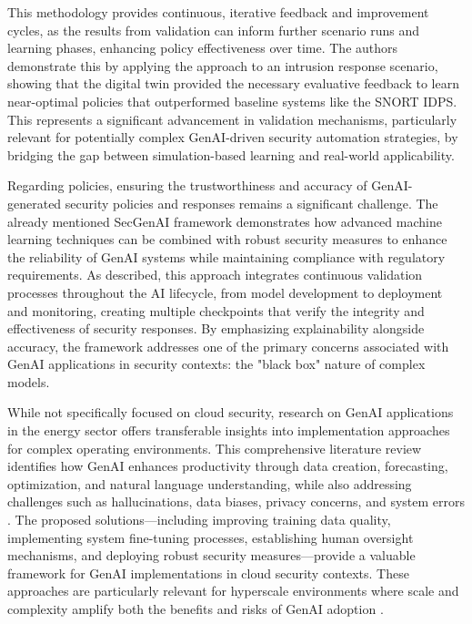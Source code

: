 This methodology provides continuous, iterative feedback and improvement cycles, as the results from validation can inform further scenario runs and learning phases, enhancing policy effectiveness over time\cite{hammar_digital_2023}. The authors demonstrate this by applying the approach to an intrusion response scenario, showing that the digital twin provided the necessary evaluative feedback to learn near-optimal policies that outperformed baseline systems like the SNORT IDPS\cite{zhou_study_2010}. This represents a significant advancement in validation mechanisms, particularly relevant for potentially complex GenAI-driven security automation strategies, by bridging the gap between simulation-based learning and real-world applicability\cite{hammar_digital_2023}.

Regarding policies, ensuring the trustworthiness and accuracy of GenAI-generated security policies and responses remains a significant challenge. The already mentioned SecGenAI framework demonstrates how advanced machine learning techniques can be combined with robust security measures to enhance the reliability of GenAI systems while maintaining compliance with regulatory requirements.\cite{haryanto_secgenai_2024}
As described, this approach integrates continuous validation processes throughout the AI lifecycle, from model development to deployment and monitoring, creating multiple checkpoints that verify the integrity and effectiveness of security responses. By emphasizing explainability alongside accuracy, the framework addresses one of the primary concerns associated with GenAI applications in security contexts: the "black box" nature of complex models.\cite{haryanto_secgenai_2024}

While not specifically focused on cloud security, research on GenAI applications in the energy sector offers transferable insights into implementation approaches for complex operating environments. This comprehensive literature review identifies how GenAI enhances productivity through data creation, forecasting, optimization, and natural language understanding, while also addressing challenges such as hallucinations, data biases, privacy concerns, and system errors \cite{surathunmanun_exploring_2024}.
The proposed solutions—including improving training data quality, implementing system fine-tuning processes, establishing human oversight mechanisms, and deploying robust security measures—provide a valuable framework for GenAI implementations in cloud security contexts. These approaches are particularly relevant for hyperscale environments where scale and complexity amplify both the benefits and risks of GenAI adoption \cite{surathunmanun_exploring_2024}.

